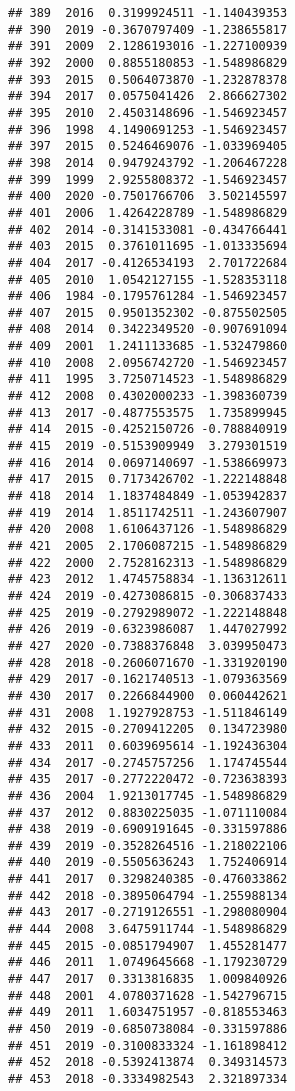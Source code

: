 \documentclass[
]{article}
\begin{document}
\begin{verbatim}
## 389  2016  0.3199924511 -1.140439353
## 390  2019 -0.3670797409 -1.238655817
## 391  2009  2.1286193016 -1.227100939
## 392  2000  0.8855180853 -1.548986829
## 393  2015  0.5064073870 -1.232878378
## 394  2017  0.0575041426  2.866627302
## 395  2010  2.4503148696 -1.546923457
## 396  1998  4.1490691253 -1.546923457
## 397  2015  0.5246469076 -1.033969405
## 398  2014  0.9479243792 -1.206467228
## 399  1999  2.9255808372 -1.546923457
## 400  2020 -0.7501766706  3.502145597
## 401  2006  1.4264228789 -1.548986829
## 402  2014 -0.3141533081 -0.434766441
## 403  2015  0.3761011695 -1.013335694
## 404  2017 -0.4126534193  2.701722684
## 405  2010  1.0542127155 -1.528353118
## 406  1984 -0.1795761284 -1.546923457
## 407  2015  0.9501352302 -0.875502505
## 408  2014  0.3422349520 -0.907691094
## 409  2001  1.2411133685 -1.532479860
## 410  2008  2.0956742720 -1.546923457
## 411  1995  3.7250714523 -1.548986829
## 412  2008  0.4302000233 -1.398360739
## 413  2017 -0.4877553575  1.735899945
## 414  2015 -0.4252150726 -0.788840919
## 415  2019 -0.5153909949  3.279301519
## 416  2014  0.0697140697 -1.538669973
## 417  2015  0.7173426702 -1.222148848
## 418  2014  1.1837484849 -1.053942837
## 419  2014  1.8511742511 -1.243607907
## 420  2008  1.6106437126 -1.548986829
## 421  2005  2.1706087215 -1.548986829
## 422  2000  2.7528162313 -1.548986829
## 423  2012  1.4745758834 -1.136312611
## 424  2019 -0.4273086815 -0.306837433
## 425  2019 -0.2792989072 -1.222148848
## 426  2019 -0.6323986087  1.447027992
## 427  2020 -0.7388376848  3.039950473
## 428  2018 -0.2606071670 -1.331920190
## 429  2017 -0.1621740513 -1.079363569
## 430  2017  0.2266844900  0.060442621
## 431  2008  1.1927928753 -1.511846149
## 432  2015 -0.2709412205  0.134723980
## 433  2011  0.6039695614 -1.192436304
## 434  2017 -0.2745757256  1.174745544
## 435  2017 -0.2772220472 -0.723638393
## 436  2004  1.9213017745 -1.548986829
## 437  2012  0.8830225035 -1.071110084
## 438  2019 -0.6909191645 -0.331597886
## 439  2019 -0.3528264516 -1.218022106
## 440  2019 -0.5505636243  1.752406914
## 441  2017  0.3298240385 -0.476033862
## 442  2018 -0.3895064794 -1.255988134
## 443  2017 -0.2719126551 -1.298080904
## 444  2008  3.6475911744 -1.548986829
## 445  2015 -0.0851794907  1.455281477
## 446  2011  1.0749645668 -1.179230729
## 447  2017  0.3313816835  1.009840926
## 448  2001  4.0780371628 -1.542796715
## 449  2011  1.6034751957 -0.818553463
## 450  2019 -0.6850738084 -0.331597886
## 451  2019 -0.3100833324 -1.161898412
## 452  2018 -0.5392413874  0.349314573
## 453  2018 -0.3334982543  2.321897334

\end{verbatim}
\end{document}
